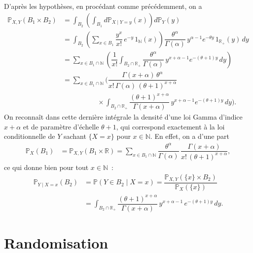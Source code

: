 \label{III-answer-loiconj-gampoi}
D'après les hypothèses, en procédant comme précédemment, on a
\begin{align*}
\mathbb{P}_{X,Y}(B_1\times B_2) &= \int_{B_2} \left(\int_{B_1} d\mathbb{P}_{X\mid Y = y}(x) \right) d\mathbb{P}_Y(y)\\
&= \int_{B_2} \left(\sum_{x\in B_1} \dfrac{y^{x}}{x!}\,e^{-y}\,1_{\mathbb{N}}(x) \right) \dfrac{\theta^{\alpha}}{\Gamma(\alpha)}\,y^{\alpha-1}e^{-\theta y}\,1_{\mathbb{R}_+}(y)\,dy\\
&= \sum_{x\in B_1\cap\mathbb{N}} \left(\dfrac{1}{x!} \int_{B_2\cap\mathbb{R}_+} \dfrac{\theta^{\alpha}}{\Gamma(\alpha)}\,y^{x+\alpha-1}e^{-(\theta+1) y}\,dy\right)\\
&= \sum_{x\in B_1\cap\mathbb{N}} \biggl(\dfrac{\Gamma(x+\alpha)\,\theta^\alpha}{x!\,\Gamma(\alpha)\,(\theta+1)^{x+\alpha}}\\
&\hspace{5em} \times \int_{B_2\cap\mathbb{R}_+} \dfrac{(\theta+1)^{x+\alpha}}{\Gamma(x+\alpha)}\,y^{x+\alpha-1}e^{-(\theta+1) y}\,dy\biggr).
\end{align*} On reconnaît dans cette dernière intégrale la densité d'une
loi Gamma d'indice \(x+\alpha\) et de paramètre d'échelle \(\theta+1\),
qui correspond exactement à la loi conditionnelle de \(Y\) sachant
\(\{X=x\}\) pour \(x\in\mathbb{N}\). En effet, on a d'une part
\begin{align*}
\mathbb{P}_X(B_1) &= \mathbb{P}_{X,Y}(B_1 \times \mathbb{R}) = \sum_{x\in B_1\cap\mathbb{N}} \dfrac{\theta^\alpha}{\Gamma(\alpha)}\, \dfrac{\Gamma(x+\alpha)}{x!\,(\theta+1)^{x+\alpha}},
\end{align*} ce qui donne bien pour tout \(x\in\mathbb{N}\)~:
\begin{align*}
\mathbb{P}_{Y\mid X=x} (B_2) &= \mathbb{P}\left(Y \in B_2 \mid X = x\right) = \dfrac{\mathbb{P}_{X,Y}\left(\{x\}\times B_2\right)}{\mathbb{P}_X(\{x\})}\\
&= \int_{B_2\cap\mathbb{R}_+} \dfrac{(\theta+1)^{x+\alpha}}{\Gamma(x+\alpha)}\,y^{x+\alpha-1}\,e^{-(\theta+1)y}\,dy.
\end{align*}

\section{Randomisation}\label{III-answer-randomize}

